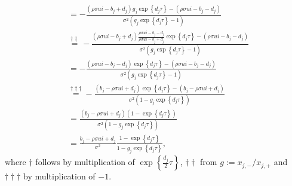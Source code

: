 \documentclass[12pt]{article}
\numberwithin{equation}{section}
\begin{document}
\begin{align*}
    & =-\frac{\left(\rho \sigma u i-b_j+d_j\right) g_j \exp\left\{d_j \tau\right\}-\left(\rho \sigma u i-b_j-d_j\right)}{\sigma^2\left(g_j \exp\left\{d_j \tau\right\}-1\right)} \\
    & \overset{\dagger\dagger}{=}-\frac{\left(\rho \sigma u i-b_j+d_j\right) \frac{\rho \sigma u i-b_j-d_j}{\rho \sigma u i-b_j+d_j} \exp\left\{d_j \tau\right\}-\left(\rho \sigma u i-b_j-d_j\right)}{\sigma^2\left(g_j \exp\left\{d_j \tau\right\}-1\right)} \\
    & =-\frac{\left(\rho \sigma u i-b_j-d_j\right) \exp\left\{d_j \tau\right\}-\left(\rho \sigma u i-b_j-d_j\right)}{\sigma^2\left(g_j \exp\left\{d_j \tau\right\}-1\right)} \\
    & \overset{\dagger\dagger\dagger}{=}-\frac{\left(b_j-\rho \sigma u i+d_j\right) \exp\left\{d_j \tau\right\}-\left(b_j-\rho \sigma u i+d_j\right)}{\sigma^2\left(1-g_j \exp\left\{d_j \tau\right\}\right)} \\
    & =\frac{\left(b_j-\rho \sigma u i+d_j\right)\left(1-\exp\left\{d_j \tau\right\}\right)}{\sigma^2\left(1-g_j \exp\left\{d_j \tau\right\}\right)} \\
    & =\frac{b_j-\rho \sigma u i + d_j}{\sigma^2} \frac{1-\exp\left\{d_j \tau\right\}}{1-g_j \exp\left\{d_j \tau\right\}},
\end{align*}
where $\dagger$ follows by multiplication of $\exp{\left \{\frac{d_j}{2}\tau
\right \}}$, $\dagger\dagger$ from $g:=x_{j,-}/x_{j,+}$ and
$\dagger\dagger\dagger$ by multiplication of $-1$.
\end{document}
